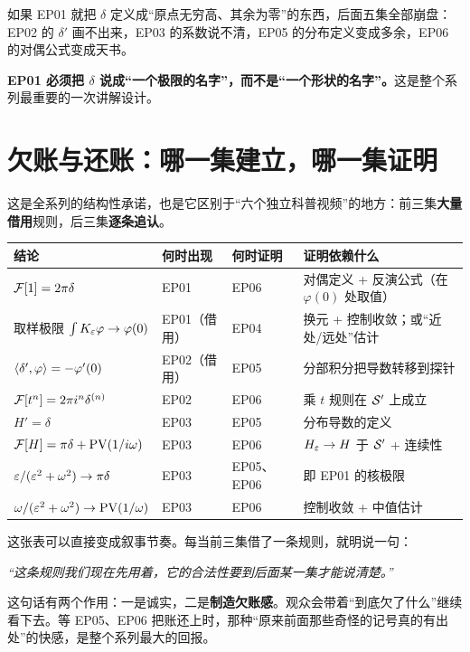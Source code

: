 \begin{warnbox}[这条暗线的反面教材]
如果 EP01 就把 $\delta$ 定义成“原点无穷高、其余为零”的东西，后面五集全部崩盘：EP02 的 $\delta'$ 画不出来，EP03 的系数说不清，EP05 的分布定义变成多余，EP06 的对偶公式变成天书。

\textbf{EP01 必须把 $\delta$ 说成“一个极限的名字”，而不是“一个形状的名字”。}这是整个系列最重要的一次讲解设计。
\end{warnbox}

\section{欠账与还账：哪一集建立，哪一集证明}

这是全系列的结构性承诺，也是它区别于“六个独立科普视频”的地方：前三集\textbf{大量借用}规则，后三集\textbf{逐条追认}。

\begin{center}
\small
\renewcommand{\arraystretch}{1.5}
\begin{tabularx}{\textwidth}{@{}L{4.6cm}L{1.8cm}L{2.0cm}Y@{}}
\toprule
结论 & 何时出现 & 何时证明 & 证明依赖什么 \\
\midrule
$\mathcal{F}[1]=2\pi\delta$ & EP01 & EP06 & 对偶定义 + 反演公式（在 $\varphi(0)$ 处取值）\\
取样极限 $\int K_{\varepsilon}\varphi\to\varphi(0)$ & EP01（借用） & EP04 & 换元 + 控制收敛；或“近处/远处”估计 \\
$\langle \delta',\varphi\rangle=-\varphi'(0)$ & EP02（借用） & EP05 & 分部积分把导数转移到探针 \\
$\mathcal{F}[t^{n}]=2\pi i^{n}\delta^{(n)}$ & EP02 & EP06 & 乘 $t$ 规则在 $\mathcal{S}'$ 上成立 \\
$H'=\delta$ & EP03 & EP05 & 分布导数的定义 \\
$\mathcal{F}[H]=\pi\delta+\operatorname{PV}(1/i\omega)$ & EP03 & EP06 & $H_{\varepsilon}\to H$ 于 $\mathcal{S}'$ + 连续性 \\
$\varepsilon/(\varepsilon^{2}+\omega^{2})\to\pi\delta$ & EP03 & EP05、EP06 & 即 EP01 的核极限 \\
$\omega/(\varepsilon^{2}+\omega^{2})\to\operatorname{PV}(1/\omega)$ & EP03 & EP06 & 控制收敛 + 中值估计 \\
\bottomrule
\end{tabularx}
\end{center}

\begin{ideabox}[讲解上的用法]
这张表可以直接变成叙事节奏。每当前三集借了一条规则，就明说一句：

\begin{center}
\itshape
“这条规则我们现在先用着，它的合法性要到后面某一集才能说清楚。”
\end{center}

这句话有两个作用：一是诚实，二是\textbf{制造欠账感}。观众会带着“到底欠了什么”继续看下去。等 EP05、EP06 把账还上时，那种“原来前面那些奇怪的记号真的有出处”的快感，是整个系列最大的回报。
\end{ideabox}

